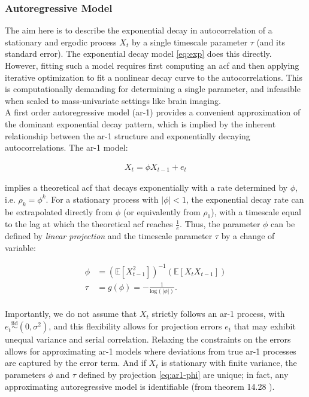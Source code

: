 \documentclass[main.tex]{subfiles}
\begin{document}
\subsubsection{Autoregressive Model}
The aim here is to describe the exponential decay in autocorrelation of a stationary and ergodic process $X_t$ by a single timescale parameter $\tau$ (and its standard error). The exponential decay model \eqref{eq:exp} does this directly. However, fitting such a model requires first computing an acf and then applying iterative optimization to fit a nonlinear decay curve to the autocorrelations. This is computationally demanding for determining a single parameter, and infeasible when scaled to mass-univariate settings like brain imaging.\\

A first order autoregressive model (ar-1) provides a convenient approximation of the dominant exponential decay pattern, which is implied by the inherent relationship between the ar-1 structure and exponentially decaying autocorrelations. The ar-1 model:

\begin{align}\label{eq:ar1}
    X_t = \phi X_{t-1} + e_t
\end{align}

implies a theoretical acf that decays exponentially with a rate determined by $\phi$, i.e. $\rho_k = \phi^k$. For a stationary process with $|\phi|<1$, the exponential decay rate can be extrapolated directly from $\phi$ (or equivalently from $\rho_1$), with a timescale equal to the lag at which the theoretical acf reaches $\frac{1}{e}$. Thus, the parameter $\phi$ can be defined by \textit{linear projection} and the timescale parameter $\tau$ by a change of variable:

\begin{align}
    \phi &= (\mathbb{E}[X_{t-1}^2])^{-1}(\mathbb{E}[X_t X_{t-1}]) \label{eq:ar1-phi}\\
    \tau &= g(\phi) = -\frac{1}{\text{log}(|\phi|)}. \label{eq:ar1-tau}
\end{align}
 \\

Importantly, we do not assume that $X_t$ strictly follows an ar-1 process, with $e_t \overset{\text{iid}}{\sim} (0, \sigma^2)$, and this flexibility allows for projection errors $e_t$ that may exhibit unequal variance and serial correlation. Relaxing the constraints on the errors allows for approximating ar-1 models where deviations from true ar-1 processes are captured by the error term. And if $X_t$ is stationary with finite variance, the parameters $\phi$ and $\tau$ defined by projection \eqref{eq:ar1-phi} are unique; in fact, any approximating autoregressive model is identifiable (from theorem 14.28 \cite{hansen_econometrics_2020}).\\
\end{document}
